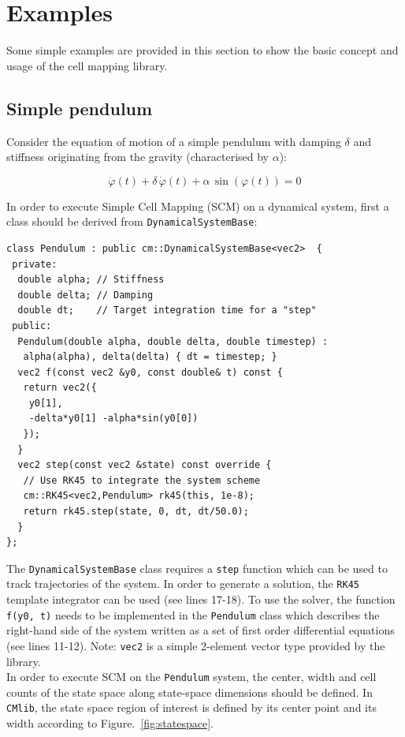 \documentclass[11pt]{article}
\begin{document}
\section{Examples}

Some simple examples are provided in this section to show the basic concept and usage of the cell mapping library.

\subsection{Simple pendulum}

Consider the equation of motion of a simple pendulum with damping $\delta$ and stiffness originating from the gravity (characterised by $\alpha$):

\begin{equation}
\ddot\varphi(t) + \delta\,\dot\varphi(t) + \alpha\,\sin(\varphi(t))=0
\end{equation}

In order to execute Simple Cell Mapping (SCM) on a dynamical system, first a class should be derived from \texttt{DynamicalSystemBase}:

\begin{lstlisting}
class Pendulum : public cm::DynamicalSystemBase<vec2>  {
 private:
  double alpha; // Stiffness
  double delta; // Damping
  double dt;    // Target integration time for a "step"
 public:
  Pendulum(double alpha, double delta, double timestep) : 
   alpha(alpha), delta(delta) { dt = timestep; }
  vec2 f(const vec2 &y0, const double& t) const {
   return vec2({
    y0[1],
    -delta*y0[1] -alpha*sin(y0[0])
   });
  }
  vec2 step(const vec2 &state) const override {
   // Use RK45 to integrate the system scheme
   cm::RK45<vec2,Pendulum> rk45(this, 1e-8);
   return rk45.step(state, 0, dt, dt/50.0);
  }
};
\end{lstlisting}

The \texttt{DynamicalSystemBase} class requires a \texttt{step} function which can be used to track trajectories of the system. In order to generate a solution, the \texttt{RK45} template integrator can be used (see lines 17-18). To use the solver,  the function \texttt{f(y0, t)} needs to be implemented in the \texttt{Pendulum} class which describes the right-hand side of the system written as a set of first order differential equations (see lines 11-12). Note: \texttt{vec2} is a simple 2-element vector type provided by the library.\\

In order to execute SCM on the \texttt{Pendulum} system, the center, width and cell counts of the state space along state-space dimensions should be defined. In \texttt{CMlib}, the state space region of interest is defined by its center point and its width according to Figure.~\ref{fig:statespace}.
\end{document}
